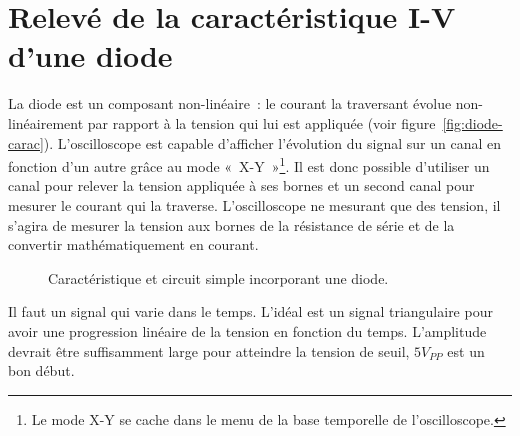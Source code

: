 \documentclass{../template/labo}
\begin{document}
\section{Relevé de la caractéristique I-V d'une diode}

La diode est un composant non-linéaire~: le courant la traversant évolue non-linéairement par rapport à la tension qui lui est appliquée (voir figure~\ref{fig:diode-carac}).
L'oscilloscope est capable d'afficher l'évolution du signal sur un canal en fonction d'un autre grâce au mode «~X-Y~»\footnote{Le mode X-Y se cache dans le menu de la base temporelle de l'oscilloscope.}.
Il est donc possible d'utiliser un canal pour relever la tension appliquée à ses bornes et un second canal pour mesurer le courant qui la traverse.
L'oscilloscope ne mesurant que des tension, il s'agira de mesurer la tension aux bornes de la résistance de série et de la convertir mathématiquement en courant.

\begin{figure}[!h]
\centering
{}
\hspace*{2cm}
\caption{Caractéristique et circuit simple incorporant une diode.}
\label{fig:diode}
\end{figure}

{
	Il faut un signal qui varie dans le temps. L'idéal est un signal triangulaire pour avoir une progression linéaire de la tension en fonction du temps.
	L'amplitude devrait être suffisamment large pour atteindre la tension de seuil, $5 V_{PP}$ est un bon début.
}
\end{document}
